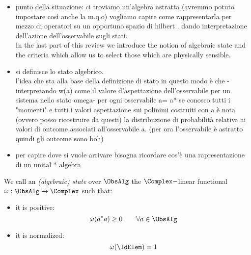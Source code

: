 \documentclass[Main]{subfiles}
\begin{document}
			\begin{Warning}
			
				\begin{itemize}
					\item punto della situazione: ci troviamo un'algebra astratta (avremmo potuto impostare così anche la m.q.o) vogliamo capire come rappresentarla per mezzo di operatori su un opportuno spazio di hilbert . 
					dando interpretazione dell'azione dell'osservabile sugli stati.\\
					In the last part of this review we introduce the notion of algebraic state and the criteria which allow us to select those which are physically sensible.
					\item si definisce lo stato algebrico.\\
						l'idea che sta alla base della definizione di stato in questo modo è che 
						 - interpretando w(a) come il valore d'aspettazione dell'osservabile per un sistema nello stato omega-  
						per ogni osservabile a= a*  se conosco tutti i "momenti" e tutti i valori aspettazione sui polinimi costruiti con a è nota (ovvero posso ricostruire da questi) la distribuzione di probabilità relativa ai valori di outcome associati all'osservabile a. (per ora l'osservabile è astratto quindi gli outcome sono boh)
					\item per capire dove si vuole arrivare bisogna ricordare cos'è una rapresentazione di un unital * algebra
						
				\end{itemize}
			\end{Warning}

				\begin{definition}
					We call an \emph{(algebraic) state} over $\ObsAlg$ the $\Complex-$linear functional $\omega: \ObsAlg \rightarrow \Complex$ such that:
					\begin{itemize}
						\item it is positive:
							$$ \omega( a^* a ) \geq 0 \qquad \forall a \in \ObsAlg$$
						\item it is normalized:
							$$ \omega(\IdElem) = 1 $$	
					\end{itemize}									
				\end{definition}
			
\end{document}
